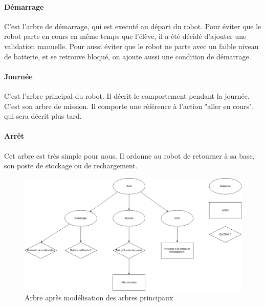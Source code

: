 \documentclass[titlepage]{article}
\begin{document}
	\paragraph{Démarrage}
	C'est l'arbre de démarrage, qui est executé au départ du robot. Pour éviter que le robot parte en cours en même temps que l'élève, il a été décidé d'ajouter une validation manuelle. Pour aussi éviter que le robot ne parte avec un faible niveau de batterie, et se retrouve bloqué, on ajoute aussi une condition de démarrage.
	\paragraph{Journée}
	C'est l'arbre principal du robot. Il décrit le comportement pendant la journée. C'est son arbre de mission. Il comporte une référence à l'action "aller en cours", qui sera décrit plus tard.
	\paragraph{Arrêt}
	Cet arbre est très simple pour nous. Il ordonne au robot de retourner à sa base, son poste de stockage ou de rechargement.
	\\
	\begin{figure}[h!]
		\centering
		\includegraphics[width=\linewidth]{img/BT_4.png}
		\caption{Arbre après modélisation des arbres principaux}
		\label{fig:exemple_3}
	\end{figure}
\end{document}
